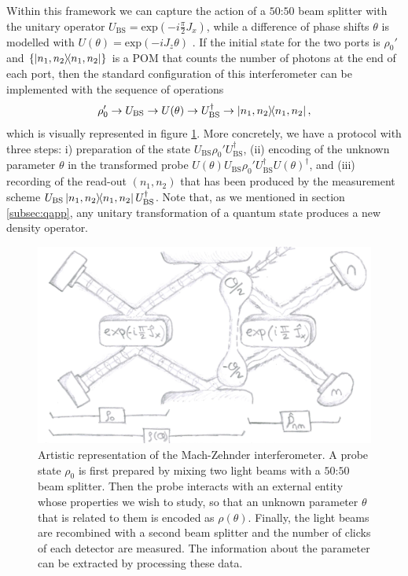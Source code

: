 Within this framework we can capture the action of a $50$:$50$ beam splitter with the unitary operator $U_{\mathrm{BS}} = \mathrm{exp}(-i \frac{\pi}{2}J_x)$, while a difference of phase shifts $\theta$ is modelled with $U(\theta) = \mathrm{exp}(-i J_z\theta)$ \cite{yurke1986, rafal2015}. If the initial state for the two ports is $\rho_0'$ and $\lbrace \ketbra{n_1, n_2}\rbrace$ is a POM that counts the number of photons at the end of each port, then the standard configuration of this interferometer can be implemented with the sequence of operations
\begin{equation}
\rho_0' \rightarrow U_{\mathrm{BS}} \rightarrow U(\theta) \rightarrow U_{\mathrm{BS}}^\dagger \rightarrow \ketbra{n_1, n_2},
\label{mzsequence}
\end{equation}
which is visually represented in figure \ref{mzinterferometer}. More concretely, we have a protocol with three steps: i) preparation of the state $U_\mathrm{BS} \rho_0' U_\mathrm{BS}^\dagger$, (ii) encoding of the unknown parameter $\theta$ in the transformed probe $U(\theta)U_\mathrm{BS} \rho_0' U_\mathrm{BS}^\dagger U(\theta)^\dagger$, and (iii) recording of the read-out $(n_1, n_2)$ that has been produced by the measurement scheme $U_\mathrm{BS}\ketbra{n_1, n_2}U_\mathrm{BS}^\dagger$. Note that, as we mentioned in section \ref{subsec:qapp}, any unitary transformation of a quantum state produces a new density operator. 

\begin{figure} [t]
    \centering
    \includegraphics[trim={0cm 0cm 0cm 0.25cm},clip,width=12cm]{pictures/ch2_fig1}
    \caption[Artistic representation of the Mach-Zehnder interferometer]{Artistic representation of the Mach-Zehnder interferometer. A probe state $\rho_0$ is first prepared by mixing two light beams with a $50$:$50$ beam splitter. Then the probe interacts with an external entity whose properties we wish to study, so that an unknown parameter $\theta$ that is related to them is encoded as $\rho(\theta)$. Finally, the light beams are recombined with a second beam splitter and the number of clicks of each detector are measured. The information about the parameter can be extracted by processing these data.}
    \label{mzinterferometer}
\end{figure}

